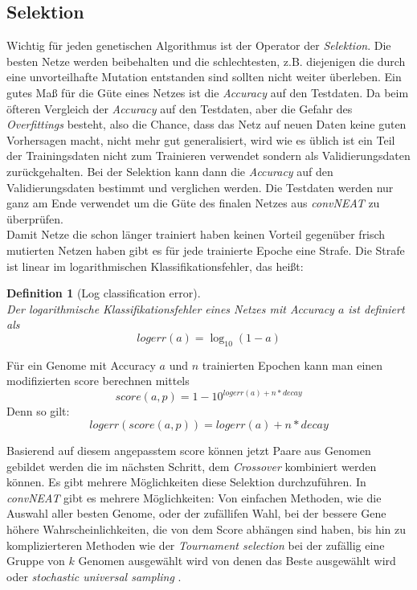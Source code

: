 \documentclass[]{scrartcl}
\newtheorem{defi}[satz]{Definition}
\begin{document}
		\subsection{Selektion}\label{select}
			
			Wichtig für jeden genetischen Algorithmus ist der Operator der \textit{Selektion}. Die besten Netze werden beibehalten und die schlechtesten,
			z.B. diejenigen die durch eine unvorteilhafte Mutation entstanden sind sollten nicht weiter überleben.
			Ein gutes Maß für die Güte eines Netzes ist die \textit{Accuracy} auf den Testdaten. Da beim öfteren Vergleich der \textit{Accuracy} auf den Testdaten,
			aber die Gefahr des \textit{Overfittings} besteht, also die Chance, dass das Netz auf neuen Daten keine guten Vorhersagen macht, nicht mehr gut generalisiert,
			wird wie es üblich ist ein Teil der Trainingsdaten nicht zum Trainieren verwendet sondern als Validierungsdaten zurückgehalten.
			Bei der Selektion kann dann die \textit{Accuracy} auf den Validierungsdaten bestimmt und verglichen werden.
			Die Testdaten werden nur ganz am Ende verwendet um die Güte des finalen Netzes aus \textit{convNEAT} zu überprüfen.\\

			Damit Netze die schon länger trainiert haben keinen Vorteil gegenüber frisch mutierten Netzen haben gibt es für jede trainierte Epoche eine Strafe.
			Die Strafe ist linear im logarithmischen Klassifikationsfehler, das heißt:

			\begin{defi}[Log classification error] ~ \\
				Der logarithmische Klassifikationsfehler eines Netzes mit Accuracy $a$ ist definiert als \\
				$$ logerr(a) = \log_{10}(1 - a)$$
			\end{defi}
		
			Für ein Genome mit Accuracy $a$ und $n$ trainierten Epochen kann man einen modifizierten score berechnen mittels\\
			$$score(a, p) =  1 - 10^{logerr(a) + n * decay}$$
			Denn so gilt:
			$$ logerr(score(a, p)) = logerr(a) + n * decay$$

			Basierend auf diesem angepasstem score können jetzt Paare aus Genomen gebildet werden die im nächsten Schritt, dem \textit{Crossover} kombiniert werden können.
			Es gibt mehrere Möglichkeiten diese Selektion durchzuführen. In \textit{convNEAT} gibt es mehrere Möglichkeiten:
			Von einfachen Methoden, wie die Auswahl aller besten Genome, oder der zufällifen Wahl, bei der bessere Gene höhere Wahrscheinlichkeiten,
			die von dem Score abhängen sind haben, bis hin zu komplizierteren Methoden wie der \textit{Tournament selection} bei der zufällig eine
			Gruppe von $k$ Genomen ausgewählt wird von denen das Beste ausgewählt wird oder \textit{stochastic universal sampling} \cite{sus}.
\end{document}
